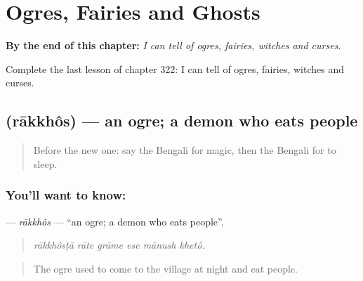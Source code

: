 
\chapter{Ogres, Fairies and Ghosts}
\label{ch:bn-ogres-fairies-and-ghosts}

\begin{chapteropening}
\textbf{By the end of this chapter:} \emph{I can tell of ogres, fairies, witches and curses.}

Complete the last lesson of chapter 322: I can tell of ogres, fairies, witches and curses.
\end{chapteropening}

\section[\texorpdfstring{\bn{রাক্ষস} (rākkhôs)}{রাক্ষস (rākkhôs)}]{ (rākkhôs) — an ogre; a demon who eats people}

\label{lesson:BN-C322-rakkhos}



\begin{quote}
Before the new one: say the Bengali for magic, then the Bengali for to sleep.
\end{quote}

\subsection*{You'll want to know: }
\textbf{} — \emph{rākkhôs} — \textquotedblleft{}an ogre; a demon who eats people\textquotedblright{}.

\begin{quote}
     
\end{quote}

\begin{quote}
\emph{rākkhôsṭā rāte grāme ese mānush khetô.}
\end{quote}

\begin{quote}
The ogre used to come to the village at night and eat people.
\end{quote}

